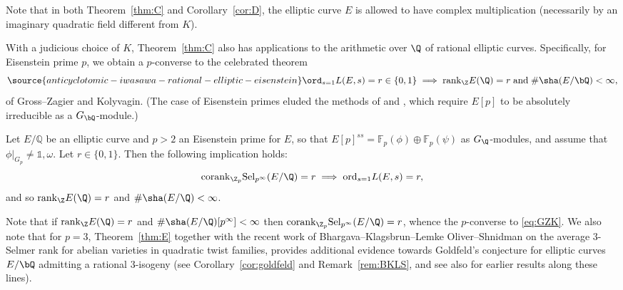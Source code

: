 Note that in both Theorem~\ref{thm:C} and Corollary~\ref{cor:D}, the elliptic curve $E$ is allowed to have complex multiplication  (necessarily by an imaginary quadratic field different from $K$).

With a judicious choice of $K$, Theorem~\ref{thm:C} also has applications to the arithmetic over $\Q$ of rational elliptic curves. Specifically, for Eisenstein prime $p$, we obtain a $p$-converse to the celebrated theorem
\begin{equation}\label{eq:GZK}
\source{anticyclotomic-iwasawa-rational-elliptic-eisenstein}
\ord_{s=1}L(E,s)=r \in \{0,1\}\;\Longrightarrow\;
{\rm rank}_\Z E(\Q)=r\;\textrm{and}\;
\#\sha(E/\bQ)<\infty,
\end{equation}
of Gross--Zagier and Kolyvagin. (The case of Eisenstein primes eluded the methods of
\cite{pCONVskinner} and \cite{wei-zhang}, which require $E[p]$ to be absolutely irreducible as a $G_\bQ$-module.)

\begin{theorem}
\notready\label{thm:E}
Let $E/\mathbb{Q}$ be an elliptic curve and $p>2$ an Eisenstein prime for $E$, so that $E[p]^{ss}=\mathbb{F}_p(\phi)\oplus\mathbb{F}_p(\psi)$ as $G_\Q$-modules, and assume that $\phi\vert_{G_p}\neq\mathds{1},\omega$. Let $r\in\{0,1\}$. Then the following implication holds:
\[
{\rm corank}_{\Z_p}{\rm Sel}_{p^\infty}(E/\Q)=r
\;\Longrightarrow\;
{\rm ord}_{s=1}L(E,s)=r,
\]
and so ${\rm rank}_\Z E(\Q)=r$ and $\#\sha(E/\Q)<\infty$.
\end{theorem}

Note that if ${\rm rank}_{\Z}E(\Q)=r$ and $\#\sha(E/\Q)[p^\infty]<\infty$ then ${\rm corank}_{\Z_p}{\rm Sel}_{p^\infty}(E/\Q)=r$,
whence the $p$-converse to \eqref{eq:GZK}. We also note that for $p=3$, Theorem~\ref{thm:E} together with the recent work of Bhargava--Klagsbrun--Lemke Oliver--Shnidman \cite{BKLS} on the average $3$-Selmer rank for abelian varieties in quadratic twist families,
provides additional evidence
towards Goldfeld's conjecture \cite{goldfeld} for elliptic curves $E/\bQ$ admitting a rational $3$-isogeny (see Corollary~\ref{cor:goldfeld} and Remark~\ref{rem:BKLS}, and see also \cite{kriz-li} for earlier results along these lines).

